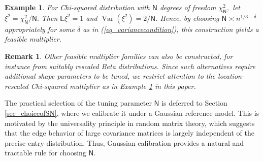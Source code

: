\documentclass[12pt]{article}
\def\sN{\mathsf N}
\def\E{\mathbb{E}}
\theoremstyle{plain}
\newtheorem{remark}{Remark}[section]
\newtheorem{example}{Example}[section]
\numberwithin{equation}{section}
\begin{document}
\begin{example}\label{example_one}
	For Chi-squared distribution with $\sN$ degrees of freedom $\chi^2_{\sN},$ let $\xi^2=\chi^2_{\sN}/\sN.$ Then $\E\xi^2=1$ and $\operatorname{Var}(\xi^2)=2/\sN$. Hence, by choosing $\sN \asymp n^{1/3-\delta}$ appropriately for some $\delta$ as in (\ref{eq_variancecondition}), this construction yields a feasible multiplier. 
	
\end{example}

\begin{remark}
	Other feasible multiplier families can also be constructed, for instance from suitably rescaled Beta distributions. Since such alternatives require additional shape parameters to be tuned, we restrict attention to the location-rescaled Chi-squared multiplier as in Example \ref{example_one} in this paper.
\end{remark}

The practical selection of the tuning parameter $\sN$ is deferred to Section \ref{sec_choiceofSN}, where we calibrate it under a Gaussian reference model. This is motivated by the universality principle in random matrix theory, which suggests that the edge behavior of large covariance matrices is largely independent of the precise entry distribution. Thus, Gaussian calibration provides a natural and tractable rule for choosing $\sN$.
\end{document}
